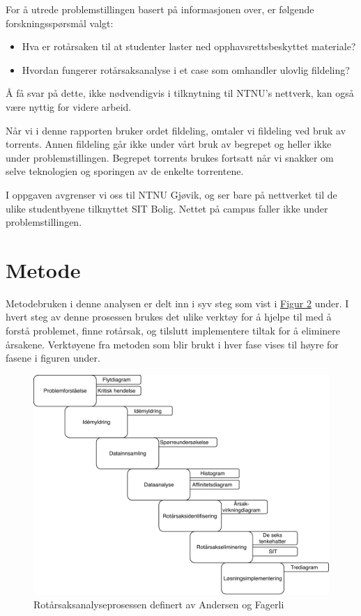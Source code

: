 For å utrede problemstillingen basert på informasjonen over, er følgende forskningsspørsmål valgt: 
\begin{itemize}
    \item Hva er rotårsaken til at studenter laster ned opphavsrettsbeskyttet materiale?
    \item Hvordan fungerer rotårsaksanalyse i et case som omhandler ulovlig fildeling?
\end{itemize}

Å få svar på dette, ikke nødvendigvis i tilknytning til NTNU's nettverk, kan også være nyttig for videre arbeid.

Når vi i denne rapporten bruker ordet fildeling, omtaler vi fildeling ved bruk av torrents. Annen fildeling går ikke under vårt bruk av begrepet og heller ikke under problemstillingen. Begrepet torrents brukes fortsatt når vi snakker om selve teknologien og sporingen av de enkelte torrentene.

I oppgaven avgrenser vi oss til NTNU Gjøvik, og ser bare på nettverket til de ulike studentbyene tilknyttet SIT Bolig. Nettet på campus faller ikke under problemstillingen.

\section{Metode}
Metodebruken i denne analysen er delt inn i syv steg som vist i \hyperref[fig:prosess]{Figur 2} under. I hvert steg av denne prosessen brukes det ulike verktøy for å hjelpe til med å forstå problemet, finne rotårsak, og tilslutt implementere tiltak for å eliminere årsakene. Verktøyene fra metoden som blir brukt i hver fase vises til høyre for fasene i figuren under. 
\begin{figure}[H]
    \centering
    \includegraphics[scale=0.7]{case_1/bilder/Prosess_case_1.pdf}
    \caption[Rotårsaksanalyseprosessen]{Rotårsaksanalyseprosessen definert av Andersen og Fagerli}
    \label{fig:prosess-case1}
\end{figure}
